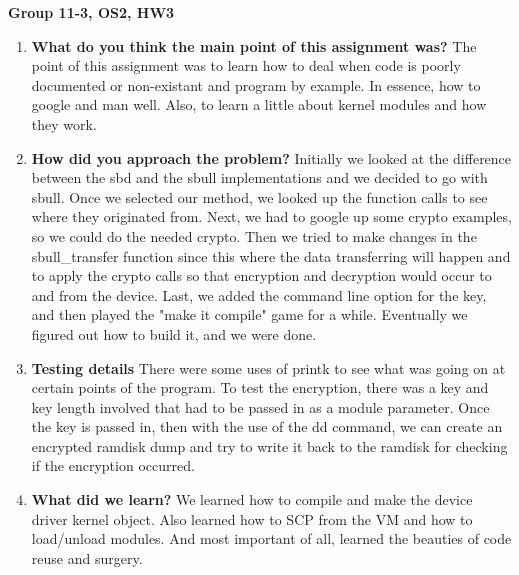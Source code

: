 \documentclass[IEEEtran,letterpaper,10pt,notitlepage,draftclsnofoot,onecolumn]{article}
\begin{document}
\textbf{Group 11-3, OS2, HW3}

\begin{enumerate}
\item 
\textbf{What do you think the main point of this assignment was?}
The point of this assignment was to learn how to deal when
code is poorly documented or non-existant and program by example.
In essence, how to google and man well.
Also, to learn a little about kernel modules and how they work.

\item 
\textbf{How did you approach the problem?}
Initially we looked at the difference between the sbd and 
the sbull implementations and we decided to go with sbull.
Once we selected our method, we looked up the function calls
to see where they originated from. Next, we had to 
google up some crypto examples, so we could do the needed
crypto. Then we tried to make changes in the sbull\_transfer 
function since this where the data transferring will happen 
and to apply the crypto calls so that encryption and decryption 
would occur to and from the device. Last, we added the command 
line option for the key, and then played the "make it compile"
game for a while. Eventually we figured out how to build it, 
and we were done.

\item
\textbf{Testing details}
There were some uses of printk to see what was going on at
certain points of the program. To test the encryption, there was a
key and key length involved that had to be passed in as a module
parameter. Once the key is passed in, then with the use of the dd
command, we can create an encrypted ramdisk dump and try to
write it back to the ramdisk for checking if the encryption occurred.

\item
\textbf{What did we learn?}
We learned how to compile and make the device driver kernel object.
Also learned how to SCP from the VM and how to load/unload modules. 
And most important of all, learned the beauties of code reuse and 
surgery.


\end{enumerate}
\end{document}
